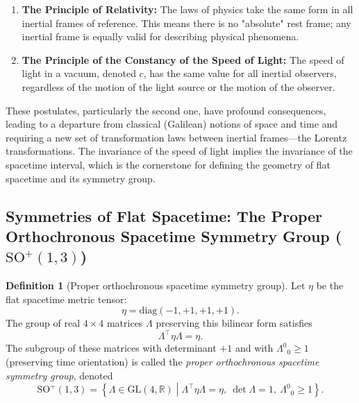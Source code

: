 \documentclass{amsart}
\theoremstyle{definition}
\newtheorem{definition}{Definition}[theorem]
\theoremstyle{remark}
\begin{document}
\begin{enumerate}
    \item \textbf{The Principle of Relativity:} The laws of physics take the same form in all inertial frames of reference. This means there is no "absolute" rest frame; any inertial frame is equally valid for describing physical phenomena.
    \item \textbf{The Principle of the Constancy of the Speed of Light:} The speed of light in a vacuum, denoted $c$, has the same value for all inertial observers, regardless of the motion of the light source or the motion of the observer.
\end{enumerate}
These postulates, particularly the second one, have profound consequences, leading to a departure from classical (Galilean) notions of space and time and requiring a new set of transformation laws between inertial frames—the Lorentz transformations. The invariance of the speed of light implies the invariance of the spacetime interval, which is the cornerstone for defining the geometry of flat spacetime and its symmetry group.

\subsection{Symmetries of Flat Spacetime: The Proper Orthochronous Spacetime Symmetry Group ($\mathrm{SO}^+(1,3)$)}
\label{subsec:so13_group}
\begin{definition}[Proper orthochronous spacetime symmetry group]
  Let $\eta$ be the flat spacetime metric tensor:
  \begin{equation*}
  \eta = \mathrm{diag}(-1, +1, +1, +1).
  \end{equation*}
  The group of real $4 \times 4$ matrices $\Lambda$ preserving this bilinear form satisfies
  \begin{equation*}
  \Lambda^\top \eta \Lambda = \eta.
  \end{equation*}
  The subgroup of these matrices with determinant $+1$ and with $\Lambda^0{}_0 \geq 1$ (preserving time orientation) is called the \emph{proper orthochronous spacetime symmetry group}, denoted
  \begin{equation*}
  \mathrm{SO}^+(1,3) = \left\{ \Lambda \in \mathrm{GL}(4,\mathbb{R}) \middle|
  \Lambda^\top \eta \Lambda = \eta,\ \det \Lambda = 1,\ \Lambda^0{}_0 \geq 1 \right\}.
  \end{equation*}
\end{definition}
\end{document}

